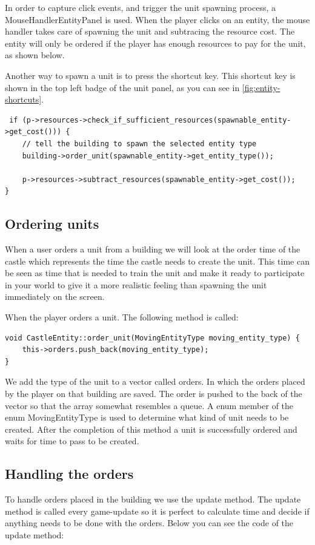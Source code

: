 In order to capture click events, and trigger the unit spawning process, a MouseHandlerEntityPanel is used. When the player clicks on an entity, the mouse handler takes care of spawning the unit and subtracing the resource cost. The entity will only be ordered if the player has enough resources to pay for the unit, as shown below.

Another way to spawn a unit is to press the shortcut key. This shortcut key is shown in the top left badge of the unit panel, as you can see in  \cref{fig:entity-shortcuts}.

\begin{lstlisting}
 if (p->resources->check_if_sufficient_resources(spawnable_entity->get_cost())) {
    // tell the building to spawn the selected entity type
    building->order_unit(spawnable_entity->get_entity_type());
    
    p->resources->subtract_resources(spawnable_entity->get_cost());
}
\end{lstlisting}

\subsection{Ordering units}
When a user orders a unit from a building we will look at the order time of the castle which represents the time the castle needs to create the unit. This time can be seen as time that is needed to train the unit and make it ready to participate in your world to give it a more realistic feeling than spawning the unit immediately on the screen. 

When the player orders a unit. The following method is called:

\begin{lstlisting}
void CastleEntity::order_unit(MovingEntityType moving_entity_type) {
    this->orders.push_back(moving_entity_type);
}
\end{lstlisting}

We add the type of the unit to a vector called orders. In which the orders placed by the player on that building are saved. The order is pushed to the back of the vector so that the array somewhat resembles a queue. A enum member of the enum MovingEntityType is used to determine what kind of unit needs to be created. After the completion of this method a unit is successfully ordered and waits for time to pass to be created.

\subsection{Handling the orders}
To handle orders placed in the building we use the update method. The update method is called every game-update so it is perfect to calculate time and decide if anything needs to be done with the orders. Below you can see the code of the update method:

